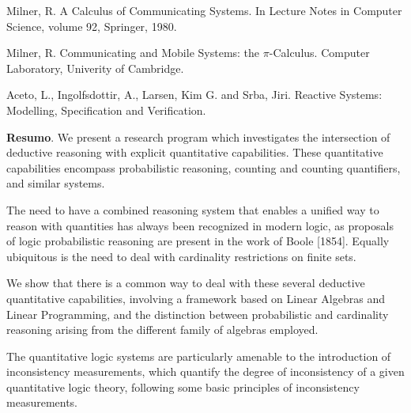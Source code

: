 	\begin{thebibliography}{999}
		 Milner, R. A Calculus of Communicating Systems. In Lecture Notes in Computer Science, volume 92, Springer, 1980.
		
		 Milner, R. Communicating and Mobile Systems: the $\pi$-Calculus. Computer Laboratory, Univerity of Cambridge.
		
		 Aceto, L.,   Ingolfsdottir, A.,   Larsen, Kim G. and  Srba, Jiri. Reactive Systems: Modelling, Specification and Verification.
	\end{thebibliography}

	\vspace{24pt}



	\noindent\textbf{Resumo}.\label{mf} 
	We present a research program which investigates the intersection of deductive reasoning with explicit quantitative capabilities.  These quantitative capabilities encompass probabilistic reasoning, counting and counting quantifiers, and similar systems.

	The need to have a combined reasoning system that enables a unified way to reason with quantities has always been recognized in modern logic, as proposals of logic probabilistic reasoning are present in the work of Boole [1854]. Equally ubiquitous is the need to deal with cardinality restrictions on finite sets.

	We show that there is a common way to deal with these several deductive quantitative capabilities, involving a framework based on Linear Algebras and Linear Programming, and the distinction between probabilistic and cardinality reasoning arising from the different family of algebras employed.

	The quantitative logic systems are particularly amenable to the introduction of inconsistency measurements, which quantify the degree of inconsistency of a given quantitative logic theory, following some basic principles of inconsistency measurements.

\vspace{24pt}
	
